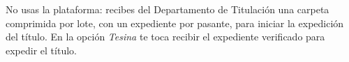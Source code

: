\documentclass[11pt,a4paper]{article}
\begin{document}
{\small\tableofcontents}
\newpage
\begin{quevasahacer}
No usas la plataforma: recibes del Departamento de Titulación una carpeta comprimida por lote, con un expediente por pasante, para iniciar la expedición del título. En la opción \emph{Tesina} te toca recibir el expediente verificado para expedir el título.
\end{quevasahacer}



\end{document}
